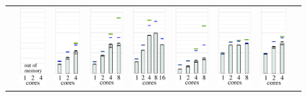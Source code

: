\begin{tabular}{lcccccccc}
  & 
  \includegraphics[height=3.0cm,clip=true]{images/perf/p-80/p-woody-hsw-omen-rgf-tc4_5}%
  & 
  \includegraphics[height=3.0cm,clip=true]{images/perf/p-80/p-hasep1-omen-rgf-tc4_5}%
  & 
  \includegraphics[height=3.0cm,clip=true]{images/perf/p-80/p-meggie-omen-rgf-tc4_5}%
  & 
  \includegraphics[height=3.0cm,clip=true]{images/perf/p-80/p-skylakesp2-omen-rgf-tc4_5}%
  & 
  \includegraphics[height=3.0cm,clip=true]{images/perf/p-80/p-knightmare1-omen-rgf-tc4_5}%
  & 
  \includegraphics[height=3.0cm,clip=true]{images/perf/p-80/p-summitridge1-omen-rgf-tc4_5}%
  & 
  \includegraphics[height=3.0cm,clip=true]{images/perf/p-80/p-naples1-omen-rgf-tc4_5}%
\\



\end{tabular}
